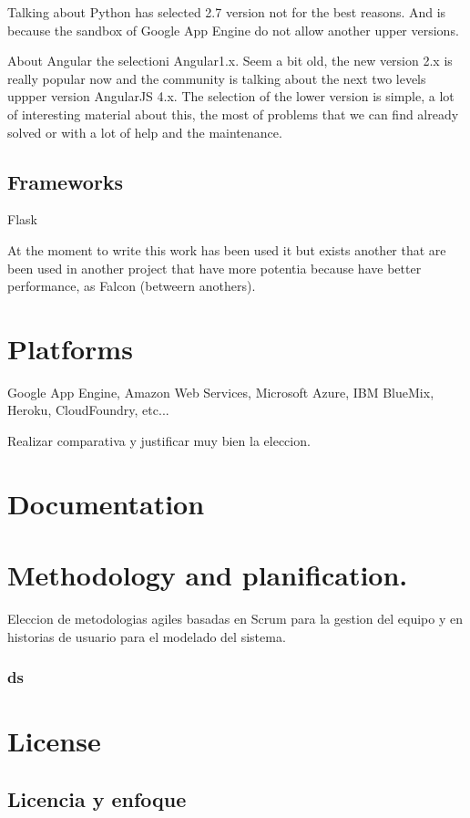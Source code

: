 Talking about Python has selected 2.7 version not for the best reasons.
And is because the sandbox of Google App Engine do not allow another upper versions.

About Angular the selectioni Angular1.x. Seem a bit old, the new version 2.x
is really popular now and the community is talking about the next two levels
uppper version AngularJS 4.x.
The selection of the lower version is simple, a lot of interesting material
about this, the most of problems that we can find already solved or with a lot
of help and the maintenance.

\subsection{Frameworks}

Flask

At the moment to write this work has been used it but exists another
that are been used in another project that have more potentia because have
better performance, as Falcon (betweern anothers).









\section{Platforms}

Google App Engine, Amazon Web Services, Microsoft Azure, IBM BlueMix,
Heroku, CloudFoundry, etc...

Realizar comparativa y justificar muy bien la eleccion.

\section{Documentation}

\section{Methodology and planification.}

Eleccion de metodologias agiles basadas en Scrum para la gestion del
equipo y en historias de usuario para el modelado del sistema.

\subsubsection {ds}

\section{License}

\subsection{Licencia y enfoque}
